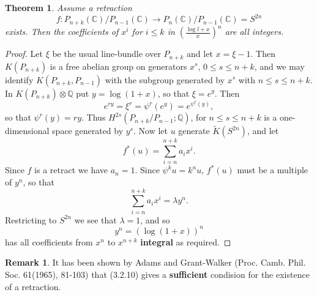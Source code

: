 \documentclass[leqno]{book}
\numberwithin{equation}{section}
\newtheorem{theorem}{Theorem}[section]%
\theoremstyle{definition}
\newtheorem*{remark}{Remark}
\renewcommand{\emph}{\textbf}
\begin{document}
            \begin{theorem}
              Assume a retraction
              \begin{equation*}
                f:P_{n+k}(\mathbb{C})/P_{n-1}(\mathbb{C})\to P_{n}(\mathbb{C})/P_{n-1}(\mathbb{C})=S^{2n}
              \end{equation*}
              exists. Then the coefficients of $x^{i}$ for $i\le k$ in $\left(\frac{\log l+x}{x}\right)^{n}$ are all integers.
            \end{theorem}

            \begin{proof}
              Let $\xi$ be the usual line-bundle over $P_{n+k}$ and let $x=\xi-1$. Then $K(P_{n+k})$ is a free abelian group on generators $x^{s}$, $0\le s\le n+k$, and we may identify $K(P_{n+k},P_{n-1})$ with the subgroup generated by $x^{s}$ with $n\le s\le n+k$. In $K(P_{n+k})\otimes \mathbb{Q}$ put $y=\log (1+x)$, so that $\xi =e^{y}$. Then 
              \begin{equation*}
                e^{ry}=\xi ^{r}=\psi^{r}(e^{y})=e^{\psi^{r}(y)},
              \end{equation*}
              so that $\psi^{r}(y)=ry$. Thus $H^{2s}(P_{n+k}/P_{n-1};\mathbb{Q})$, for $n\le s\le n+k$ is a one-dimensional space generated by $y^{s}$. Now let $u$ generate $\tilde{K}(S^{2n})$, and let
              \begin{equation*}
                f^{*}(u)=\sum_{i=n} ^{n+k} a_{i}x^{i}.
              \end{equation*}
              Since $f$ is a retract we have $a_{n}=1$. Since $\psi^{k}u=k^{n}u$, $f^{*}(u)$ must be a multiple of $y^{n}$, so that
              \begin{equation*}
                \sum_{i= n}^{n+k} a_{i}x^{i}=\lambda y^{n}.
              \end{equation*}
              Restricting to $S^{2n}$ we see that $\lambda=1$, and so 
              \begin{equation*}
                y^{n}=(\log (1+x))^{n}
              \end{equation*}
              has all coefficients from $x^{n}$ to $x^{n+k}$ \emph{integral} as required.
            \end{proof}

            \begin{remark}
              It has been shown by Adams and Grant-Walker (Proc. Camb. Phil. Soc. 61(1965), 81-103) that (3.2.10) gives a \emph{sufficient} condision for the existence of a retraction.
            \end{remark}
\end{document}
